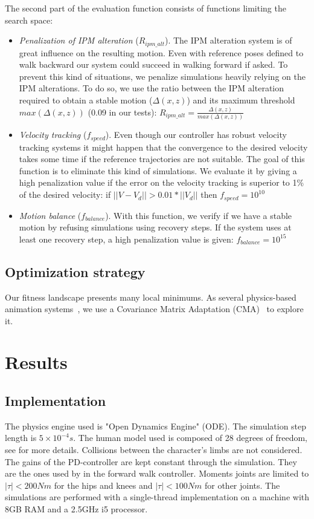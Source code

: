 \documentclass[conference]{acmsiggraph}
\begin{document}
The second part of the evaluation function consists of functions limiting the search space:
\begin{itemize}
\item{\textit{Penalization of IPM alteration} ($R_{ipm\_alt}$). The IPM alteration system is of great influence on the resulting motion. Even with reference poses defined to walk backward our system could succeed in walking forward if asked. To prevent this kind of situations, we penalize simulations heavily relying on the IPM alterations. To do so, we use the ratio between the IPM alteration required to obtain a stable motion ($\Delta(x,z)$) and its maximum threshold $max(\Delta(x,z))$ (0.09 in our tests): $R_{ipm\_alt}=\frac{\Delta(x,z)}{max(\Delta(x,z))}$}
\item{\textit{Velocity tracking} ($f_{speed}$). Even though our controller has robust velocity tracking systems it might happen that the convergence to the desired velocity takes some time if the reference trajectories are not suitable. The goal of this function is to eliminate this kind of simulations. We evaluate it by giving a high penalization value if the error on the velocity tracking is superior to 1\% of the desired velocity: if $||V-V_d||>0.01*||V_d||$ then $f_{speed}=10^{10}$}
\item{\textit{Motion balance} ($f_{balance}$). With this function, we verify if we have a stable motion by refusing simulations using recovery steps. If the system uses at least one recovery step, a high penalization value is given: $f_{balance}=10^{15}$}
\end{itemize}

\subsection{Optimization strategy}
Our fitness landscape presents many local minimums. As several physics-based animation systems~\cite{geijtenbeek2012simple,tan2011articulated}, we use a Covariance Matrix Adaptation (CMA)~\cite{hansen2006cma} to explore it.

\section{Results}
\label{sec:results}

\subsection{Implementation}
The physics engine used is "Open Dynamics Engine" (ODE). The simulation step length is $5 \times 10^{-4}s$. The human model used is composed of 28 degrees of freedom, see \cite{coros2009robust} for more details. Collisions between the character's limbs are not considered. The gains of the PD-controller are kept constant through the simulation. They are the ones used by \cite{coros2009robust} in the forward walk controller. Moments joints are limited to $|\tau|<200Nm$  for the hips and knees and $|\tau|<100Nm$  for other joints.
The simulations are performed with a single-thread implementation on a machine with 8GB RAM and a 2.5GHz i5 processor. 
\end{document}
